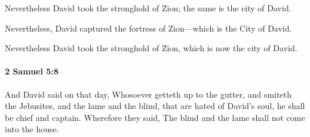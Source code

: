 			\begin{versebox}
					\item[BHS] 
					\item[ASV] Nevertheless David took the stronghold of Zion; the same is the city of David.
					\item[NIV] Nevertheless, David captured the fortress of Zion—which is the City of David.
					\item[NRSV] Nevertheless David took the stronghold of Zion, which is now the city of David.
			\end{versebox}

		\paragraph{2 Samuel 5:8} %
			\label{2SAMUEL-5-8}

			And David said on that day, Whosoever getteth up to the gutter, and smiteth the Jebusites, and the lame and the blind, that are hated of David’s soul, he shall be chief and captain. Wherefore they said, The blind and the lame shall not come into the house.

